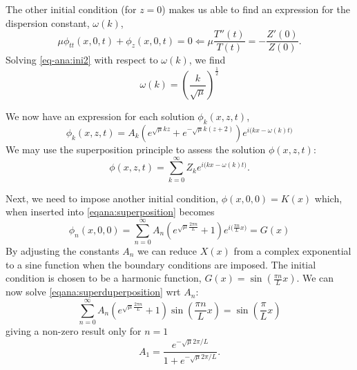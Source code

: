 \documentclass[11pt]{article}
\begin{document}
The other initial condition (for $z=0$) makes us able to find an expression for the dispersion constant, $\omega(k)$,
\begin{equation}
\mu \phi_{tt}(x,0,t) + \phi_{z}(x,0,t) = 0 \Longleftarrow \mu \frac{T''(t)}{T(t)} = - \frac{Z'(0)}{Z(0)}.
\label{eq-ana:ini2}
\end{equation}
Solving \eqref{eq-ana:ini2} with respect to $\omega(k)$, we find
\begin{equation*}
\omega(k) = \left( \frac{k}{\sqrt{\mu}} \right)^{\frac{1}{2}}
\end{equation*}

We now have an expression for each solution $\phi_k(x,z,t)$,
\begin{equation*}
\phi_k(x,z,t) = A_k \left( e^{\sqrt{\mu}kz} + e^{-\sqrt{\mu}k(z+2)} \right) e^{i\big( kx - \omega(k)t \big)}
\end{equation*}
We may use the superposition principle to assess the solution $\phi(x,z,t)$:
\begin{equation}
\label{eqana:superposition}
\phi(x,z,t) = \sum_{k=0}^{\infty} Z_k e^{i\big(kx - \omega(k) t \big)}.
\end{equation}

Next, we need to impose another initial condition, $\phi(x,0,0) = K(x)$ which, when inserted into \eqref{eqana:superposition} becomes
\begin{equation}
\phi_n(x,0,0) = \sum_{n=0}^{\infty} A_n \left( e^{\sqrt{\mu}\frac{2 \pi n}{L}} + 1 \right) e^{ i \big( \frac{\pi n}{L}x \big) } = G(x)
\label{eqana:superduperposition}
\end{equation}
By adjusting the constants $A_n$ we can reduce $X(x)$ from a complex exponential to a sine function when the boundary conditions are imposed. The initial condition is chosen to be a harmonic function, $G(x) = \sin \left(\frac{\pi n}{L}x \right)$. We can now solve \eqref{eqana:superduperposition} wrt $A_n$:
\begin{equation*}
\sum_{n=0}^{\infty} A_n \left( e^{\sqrt{\mu}\frac{2 \pi n}{L}} + 1 \right) \sin \left(\frac{\pi n}{L}x \right) = \sin \left( \frac{\pi }{L}x \right)
\end{equation*}
giving a non-zero result only for $n=1$
\begin{equation*}
A_1 = \frac{e^{- \sqrt{\mu}2\pi  /L } }{1 + e^{- \sqrt{\mu} 2\pi /L}}.
\end{equation*}
\end{document}

